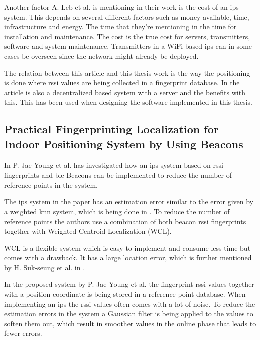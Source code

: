 \bigskip

Another factor A. Leb et al. is mentioning in their work is the cost of an \acrshort{ips} system.
This depends on several different factors such as money available, time, infrastructure and energy.
The time that they're mentioning in the time for installation and maintenance.
The cost is the true cost for servers, transmitters, software and system maintenance.
Transmitters in a WiFi based \acrshort{ips} can in some cases be overseen since the network might already be deployed.

\bigskip

The relation between this article and this thesis work is the way the positioning is done where \acrshort{rssi} values are being collected in a fingerprint database.
In the article is also a decentralized based system with a server and the benefits with this.
This has been used when designing the software implemented in this thesis.


\subsection{Practical Fingerprinting Localization for Indoor Positioning System by Using Beacons}\label{sec:}
In \cite{PracticalFingerprintingLocalization2017} P. Jae-Young et al. has investigated how an \acrshort{ips} system based on \acrshort{rssi} fingerprints and \acrshort{ble} Beacons can be implemented to reduce the number of reference points in the system.

\bigskip

The \acrshort{ips} system in the paper has an estimation error similar to the  error given by a weighted \acrshort{knn} system, which is being done in \cite{ImprovingIndoorLocalization2016}.
To reduce the number of reference points the authors use a combination of both beacon \acrshort{rssi} fingerprints together with Weighted Centroid Localization (WCL). 

\bigskip

WCL is a flexible system which is easy to implement and consume less time but comes with a drawback. 
It has a large location error, which is further mentioned by H. Suk-seung et al. in \cite{BeaconBasedIndoor2016}.

\bigskip

In the proposed system by P. Jae-Young et al. the fingerprint \acrshort{rssi} values together with a position coordinate is being stored in a reference point database.
When implementing an \acrshort{ips} the \acrshort{rssi} values often comes with a lot of noise.
To reduce the estimation errors in the system a Gaussian filter is being applied to the values to soften them out, which result in smoother values in the online phase that leads to fewer errors.  


